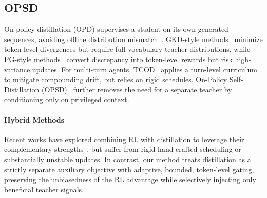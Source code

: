 \documentclass{article} %
\begin{document}
\subsection{OPSD}
  On-policy distillation (OPD) supervises a student on its own generated sequences, avoiding offline distribution mismatch~\citep{agarwal2024gkd,gu2026minillm}. GKD-style methods~\citep{agarwal2024gkd,wen2023fdivergence} minimize token-level divergences but require full-vocabulary teacher distributions, while PG-style methods~\citep{yang2026rlsd,xu2026tip} convert discrepancy into token-level rewards but risk high-variance updates. For multi-turn agents, TCOD~\citep{wang2026tcod} applies a turn-level curriculum to mitigate compounding drift, but relies on rigid schedules. On-Policy Self-Distillation (OPSD)~\citep{zhao2026opsd,he2026sdzero} further removes the need for a separate teacher by conditioning only on privileged context.
\paragraph{Hybrid Methods} Recent works have explored combining RL with distillation to leverage their complementary strengths~\citep{wang2026skillsd,yang2026rlsd,ding2026hdpo}, but suffer from rigid hand-crafted scheduling or substantially unstable updates. In contrast, our method treats distillation as a strictly separate auxiliary objective with adaptive, bounded, token-level gating, preserving the unbiasedness of the RL advantage while selectively injecting only beneficial teacher signals.
\end{document}
